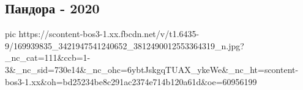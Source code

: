  
 
 
 
 

\subsection{Пандора - 2020}


\ifcmt
  pic https://scontent-bos3-1.xx.fbcdn.net/v/t1.6435-9/169939835_3421947541240652_3812490012553364319_n.jpg?_nc_cat=111&ccb=1-3&_nc_sid=730e14&_nc_ohc=6ybtJskgqTUAX_ykeWe&_nc_ht=scontent-bos3-1.xx&oh=bd25234be8c291ac2374e714b120a61d&oe=60956199
\fi

